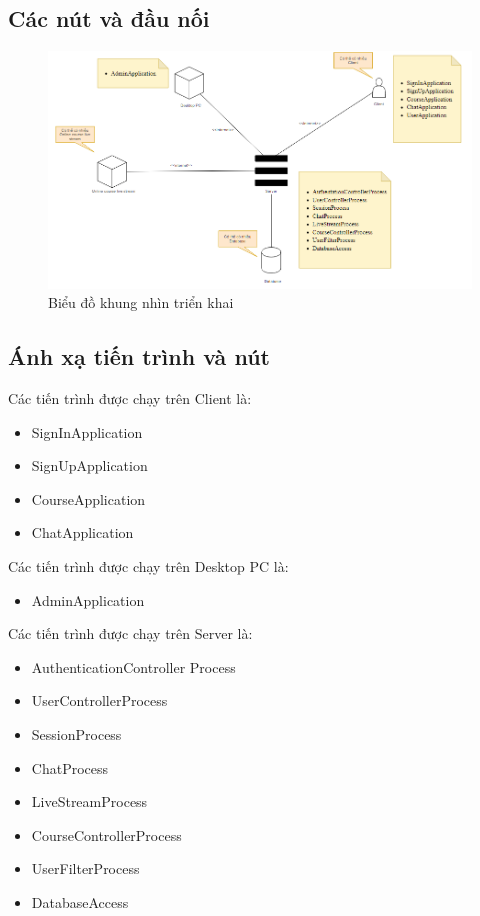 \documentclass[./../main_file.tex]{subfiles}
\begin{document}
	\subsection{Các nút và đầu nối}
	\begin{figure}[H]
		\centering
		\includegraphics[width=\textwidth]{./images/deploymentview.png}
		\caption{Biểu đồ khung nhìn triển khai}
	\end{figure}
	\subsection{Ánh xạ tiến trình và nút}
	
	Các tiến trình được chạy trên Client là:
	\begin{itemize}[leftmargin=+0.5in]
		\item SignInApplication
		\item SignUpApplication
		\item CourseApplication
		\item ChatApplication
	\end{itemize}


	Các tiến trình được chạy trên Desktop PC là:
	\begin{itemize}[leftmargin=+0.5in]
		\item AdminApplication
	\end{itemize}


	Các tiến trình được chạy trên Server là:
	\begin{itemize}[leftmargin=+0.5in]
		\item AuthenticationController Process
		\item UserControllerProcess
		\item SessionProcess
		\item ChatProcess
		\item LiveStreamProcess
		\item CourseControllerProcess
		\item UserFilterProcess
		\item DatabaseAccess
	\end{itemize}
\end{document}
